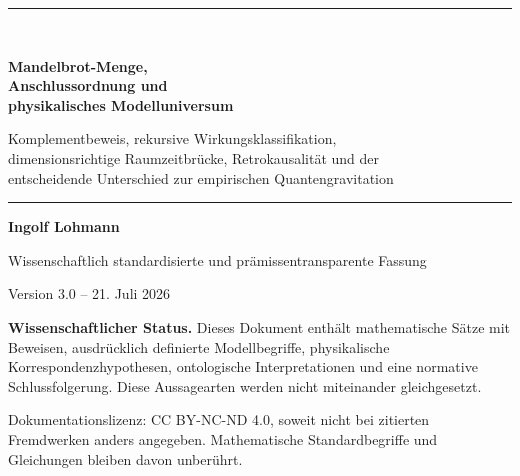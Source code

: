 \documentclass[11pt,a4paper]{article}
\theoremstyle{remark}
\newcommand{\statusbox}[2]{%
  \par\medskip\noindent
  \colorbox{#1}{\parbox{\dimexpr\linewidth-2\fboxsep\relax}{#2}}%
  \par\medskip
}
\begin{document}
\hypersetup{pageanchor=false}
\begin{titlepage}
  \thispagestyle{empty}
  \vspace*{16mm}
  {\color{QBlue}\rule{\textwidth}{1.4pt}}\\[1.2em]
  {\Huge\bfseries Mandelbrot-Menge,\\[0.2em]
  Anschlussordnung und\\[0.2em]
  physikalisches Modelluniversum\par}
  \vspace{0.8em}
  {\Large Komplementbeweis, rekursive Wirkungsklassifikation,\\
  dimensionsrichtige Raumzeitbrücke, Retrokausalität und der\\
  entscheidende Unterschied zur empirischen Quantengravitation\par}
  \vspace{1.2em}
  {\color{QBlue}\rule{\textwidth}{0.6pt}}

  \vfill
  {\large\textbf{Ingolf Lohmann}\par}
  \vspace{0.4em}
  {\normalsize Wissenschaftlich standardisierte und prämissentransparente Fassung\par}
  \vspace{0.3em}
  {\normalsize Version 3.0 -- 21. Juli 2026\par}

  \vfill
  \statusbox{QLight}{
    \textbf{Wissenschaftlicher Status.}
    Dieses Dokument enthält mathematische Sätze mit Beweisen, ausdrücklich
    definierte Modellbegriffe, physikalische Korrespondenzhypothesen,
    ontologische Interpretationen und eine normative Schlussfolgerung.
    Diese Aussagearten werden nicht miteinander gleichgesetzt.
  }

  \vfill
  {\small
    Dokumentationslizenz: CC BY-NC-ND 4.0, soweit nicht bei zitierten
    Fremdwerken anders angegeben. Mathematische Standardbegriffe und
    Gleichungen bleiben davon unberührt.
  }
\end{titlepage}
\hypersetup{pageanchor=true}
\setcounter{page}{1}

\end{document}
